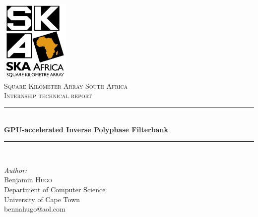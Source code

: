 \documentclass[a4paper,10pt]{article}
\begin{document}
\begin{titlepage}

\newcommand{\HRule}{\rule{\linewidth}{0.5mm}} %

\center %
 

\includegraphics[width=0.25\textwidth]{ska_logo_rgb.jpg}\\[1cm] %

 

\textsc{\LARGE Square Kilometer Array South Africa}\\[1.5cm]
\textsc{\Large Internship technical report}\\[0.5cm]


\HRule \\[0.4cm]
{ \huge \bfseries GPU-accelerated Inverse Polyphase Filterbank}\\[0.4cm]
\HRule \\[1.5cm]
 

\begin{minipage}{0.4\textwidth}
\begin{flushleft} \large
\emph{Author:}\\
Benjamin \textsc{Hugo}\\[0.2cm] %
\small{Department of Computer Science}\\
\small{University of Cape Town}\\
\small{bennahugo@aol.com}


\end{flushleft}
\end{minipage}
\end{titlepage}
\end{document}
